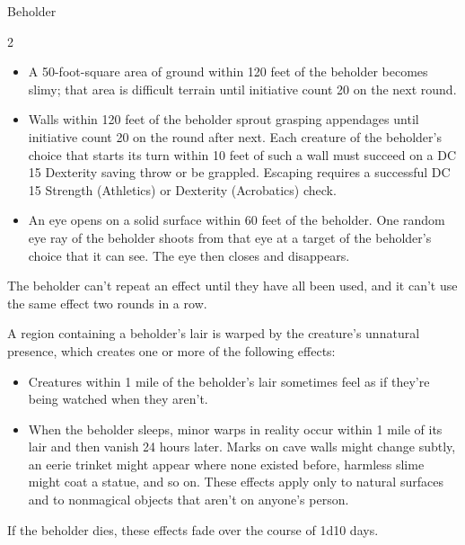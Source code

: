 \documentclass[10pt,a4paper,twoside,bg=print,twocolumn,openany,nodeprecatedcode]{dndbook}
\begin{document}
\begin{DndMonster}[float*=b,width=\textwidth + 8pt]{Beholder}
\begin{multicols}{2}
\begin{itemize}
\item A 50-foot-square area of ground within 120 feet of the beholder becomes slimy; that area is difficult terrain until initiative count 20 on the next round.
\item Walls within 120 feet of the beholder sprout grasping appendages until initiative count 20 on the round after next. Each creature of the beholder's choice that starts its turn within 10 feet of such a wall must succeed on a DC 15 Dexterity saving throw or be grappled. Escaping requires a successful DC 15 Strength (Athletics) or Dexterity (Acrobatics) check.
\item An eye opens on a solid surface within 60 feet of the beholder. One random eye ray of the beholder shoots from that eye at a target of the beholder's choice that it can see. The eye then closes and disappears.
\end{itemize}

The beholder can't repeat an effect until they have all been used, and it can't use the same effect two rounds in a row.

A region containing a beholder's lair is warped by the creature's unnatural presence, which creates one or more of the following effects:


\begin{itemize}
\item Creatures within 1 mile of the beholder's lair sometimes feel as if they're being watched when they aren't.
\item When the beholder sleeps, minor warps in reality occur within 1 mile of its lair and then vanish 24 hours later. Marks on cave walls might change subtly, an eerie trinket might appear where none existed before, harmless slime might coat a statue, and so on. These effects apply only to natural surfaces and to nonmagical objects that aren't on anyone's person.
\end{itemize}

If the beholder dies, these effects fade over the course of 1d10 days.

\end{multicols}
\end{DndMonster}
\end{document}
